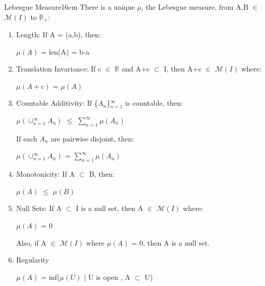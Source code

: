     \vspace{0.5cm}



    \begin{wtheorem}{Lebesgue Measure}{16cm}
        There is a unique $\mu$, the {\color{lblue} Lebesgue measure},
        from A,B $\in$ $\mathcal{M}(I)$ to $\mathbb{R}_+$: 
    \end{wtheorem}

    \begin{enumerate}[label=(\alph*), leftmargin=2cm, itemsep=0.1cm]
        \item {\color{lblue} Length}:
            If A = (a,b), then:

            \hspace{0.5cm}
            $\mu(A)$ = len(A) = b-a

        \item {\color{lgreen} Translation Invariance}:
            If c $\in$ $\mathbb{R}$ and A+c $\subset$ I, then
            A+c $\in$ $\mathcal{M}(I)$ where:
            
            \hspace{0.5cm}
            $\mu(A+c)$ = $\mu(A)$

        \item {\color{lgreen} Countable Additivity}:
            If \{$A_n$\}$_{n=1}^{\infty}$ is countable, then:

            \hspace{0.5cm}
            $\mu(\cup_{n=1}^{\infty} A_n)$
            $\leq$ $\sum_{n=1}^{\infty} \mu(A_n)$

            If each $A_n$ are pairwise disjoint, then:

            \hspace{0.5cm}
            $\mu(\cup_{n=1}^{\infty} A_n)$
            = $\sum_{n=1}^{\infty} \mu(A_n)$

        \item {\color{lgreen} Monotonicity}:
            If A $\subset$ B, then:

            \hspace{0.5cm}
            $\mu(A)$ $\leq$ $\mu(B)$

        \item {\color{lgreen} Null Sets}:
            If A $\subset$ I is a null set, then A $\in$ $\mathcal{M}(I)$ where:

            \hspace{0.5cm}
            $\mu(A)$ = 0

            Also, if A $\in$ $\mathcal{M}(I)$ where $\mu(A)$ = 0,
            then A is a null set.

        \item {\color{lgreen} Regularity}
        
            \hspace{0.5cm}
            $\mu(A)$ = inf($\mu(U)$ $|$ U is open , A $\subset$ U)
    \end{enumerate}

